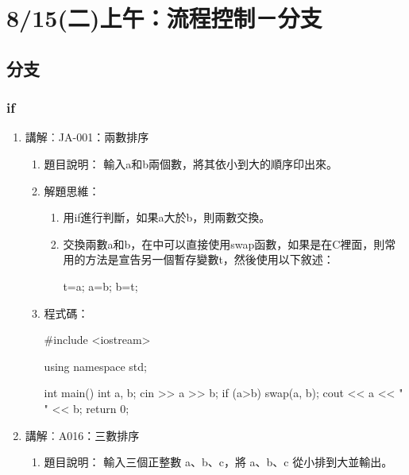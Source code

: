 
\section{8/15(二)上午：流程控制－分支}

	

\subsection{分支}

\subsubsection{if}
\begin{enumerate}
	\item 講解︰JA-001：兩數排序
		\begin{enumerate}
			\item 題目說明：
			\subitem 輸入a和b兩個數，將其依小到大的順序印出來。
			
			\item 解題思維：
			\begin{enumerate}
				\item 用if進行判斷，如果a大於b，則兩數交換。
				
				\item 交換兩數a和b，在\cc{}中可以直接使用swap函數，如果是在C裡面，則常用的方法是宣告另一個暫存變數t，然後使用以下敘述：
				\begin{inside}
				t=a; a=b; b=t;
				\end{inside}
			\end{enumerate}
			\item 程式碼：
			\begin{cppcode}
				#include <iostream>
				
				using namespace std;
				
				int main()
				{
					int a, b;
					cin >> a >> b;
					if (a>b) swap(a, b);
					cout << a << " " << b;
					return 0;
				}
					
			\end{cppcode}
		\end{enumerate}
	\item 講解︰A016：三數排序
		\begin{enumerate}
			\item 題目說明：
			\subitem 輸入三個正整數 a、b、c，將 a、b、c 從小排到大並輸出。
			

\end{enumerate}
\end{enumerate}
